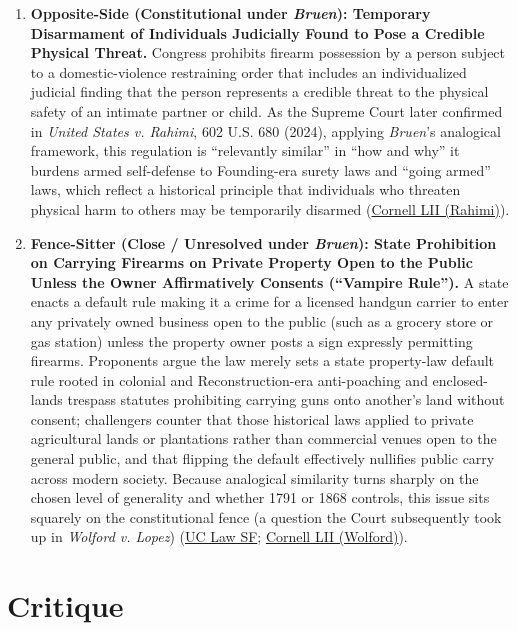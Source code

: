 \documentclass[12pt]{article}
\begin{document}
\begin{enumerate}
    \item \textbf{Opposite-Side (Constitutional under \textit{Bruen}): Temporary Disarmament of Individuals Judicially Found to Pose a Credible Physical Threat.} Congress prohibits firearm possession by a person subject to a domestic-violence restraining order that includes an individualized judicial finding that the person represents a credible threat to the physical safety of an intimate partner or child. As the Supreme Court later confirmed in \textit{United States v. Rahimi}, 602 U.S. 680 (2024), applying \textit{Bruen}'s analogical framework, this regulation is ``relevantly similar'' in ``how and why'' it burdens armed self-defense to Founding-era surety laws and ``going armed'' laws, which reflect a historical principle that individuals who threaten physical harm to others may be temporarily disarmed (\href{https://www.law.cornell.edu/supremecourt/text/22-915}{Cornell LII (Rahimi)}).

    \item \textbf{Fence-Sitter (Close / Unresolved under \textit{Bruen}): State Prohibition on Carrying Firearms on Private Property Open to the Public Unless the Owner Affirmatively Consents (``Vampire Rule'').} A state enacts a default rule making it a crime for a licensed handgun carrier to enter any privately owned business open to the public (such as a grocery store or gas station) unless the property owner posts a sign expressly permitting firearms. Proponents argue the law merely sets a state property-law default rule rooted in colonial and Reconstruction-era anti-poaching and enclosed-lands trespass statutes prohibiting carrying guns onto another's land without consent; challengers counter that those historical laws applied to private agricultural lands or plantations rather than commercial venues open to the general public, and that flipping the default effectively nullifies public carry across modern society. Because analogical similarity turns sharply on the chosen level of generality and whether 1791 or 1868 controls, this issue sits squarely on the constitutional fence (a question the Court subsequently took up in \textit{Wolford v. Lopez}) (\href{https://repository.uclawsf.edu/cgi/viewcontent.cgi?article=2238&context=hastings_constitutional_law_quaterly}{UC Law SF}; \href{https://www.law.cornell.edu/supremecourt/text/24-1046}{Cornell LII (Wolford)}).
\end{enumerate}

\section{Critique}
\end{document}
